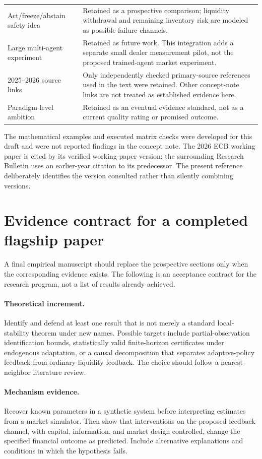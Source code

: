 \documentclass[11pt,a4paper]{article}
\theoremstyle{definition}
\theoremstyle{remark}
\begin{document}
\begin{longtable}{p{}p{}}
Act/freeze/abstain safety idea & Retained as a prospective comparison; liquidity withdrawal and remaining inventory risk are modeled as possible failure channels.\\
Large multi-agent experiment & Retained as future work. This integration adds a separate small dealer measurement pilot, not the proposed trained-agent market experiment.\\
2025--2026 source links & Only independently checked primary-source references used in the text were retained. Other concept-note links are not treated as established evidence here.\\
Paradigm-level ambition & Retained as an eventual evidence standard, not as a current quality rating or promised outcome.\\
\end{longtable}
The mathematical examples and executed matrix checks were developed for this draft and were not reported findings in the concept note. The 2026 ECB working paper is cited by its verified working-paper version; the surrounding Research Bulletin uses an earlier-year citation to its predecessor. The present reference deliberately identifies the version consulted rather than silently combining versions.

\clearpage
\section{Evidence contract for a completed flagship paper}
\label{app:contract}
A final empirical manuscript should replace the prospective sections only when the corresponding evidence exists. The following is an acceptance contract for the research program, not a list of results already achieved.

\paragraph{Theoretical increment.}
Identify and defend at least one result that is not merely a standard local-stability theorem under new names. Possible targets include partial-observation identification bounds, statistically valid finite-horizon certificates under endogenous adaptation, or a causal decomposition that separates adaptive-policy feedback from ordinary liquidity feedback. The choice should follow a nearest-neighbor literature review.

\paragraph{Mechanism evidence.}
Recover known parameters in a synthetic system before interpreting estimates from a market simulator. Then show that interventions on the proposed feedback channel, with capital, information, and market design controlled, change the specified financial outcome as predicted. Include alternative explanations and conditions in which the hypothesis fails.
\end{document}
